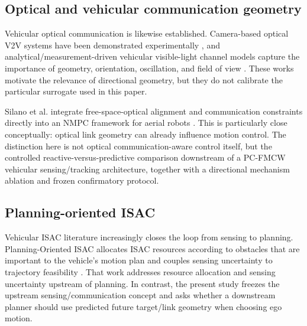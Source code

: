 \documentclass[journal]{IEEEtran}
\begin{document}
\subsection{Optical and vehicular communication geometry}
Vehicular optical communication is likewise established. Camera-based optical V2V systems have been demonstrated experimentally \cite{takai2014}, and analytical/measurement-driven vehicular visible-light channel models capture the importance of geometry, orientation, oscillation, and field of view \cite{karbalayghareh2020,turan2021,mohamed2023,avatamanitei2024}. These works motivate the relevance of directional geometry, but they do not calibrate the particular surrogate used in this paper.

Silano et al. integrate free-space-optical alignment and communication constraints directly into an NMPC framework for aerial robots \cite{silano2025}. This is particularly close conceptually: optical link geometry can already influence motion control. The distinction here is not optical communication-aware control itself, but the controlled reactive-versus-predictive comparison downstream of a PC-FMCW vehicular sensing/tracking architecture, together with a directional mechanism ablation and frozen confirmatory protocol.

\subsection{Planning-oriented ISAC}
Vehicular ISAC literature increasingly closes the loop from sensing to planning. Planning-Oriented ISAC allocates ISAC resources according to obstacles that are important to the vehicle's motion plan and couples sensing uncertainty to trajectory feasibility \cite{jin2026}. That work addresses resource allocation and sensing uncertainty upstream of planning. In contrast, the present study freezes the upstream sensing/communication concept and asks whether a downstream planner should use predicted future target/link geometry when choosing ego motion.
\end{document}
